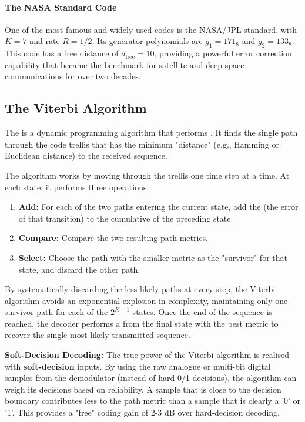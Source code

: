 \paragraph{The NASA Standard Code}
One of the most famous and widely used codes is the NASA/JPL standard, with $K=7$ and rate $R=1/2$. Its generator polynomials are $g_1 = 171_8$ and $g_2 = 133_8$. This code has a free distance of $d_{\text{free}}=10$, providing a powerful error correction capability that became the benchmark for satellite and deep-space communications for over two decades.


\subsection{The Viterbi Algorithm}

The  is a dynamic programming algorithm that performs . It finds the single path through the code trellis that has the minimum "distance" (e.g., Hamming or Euclidean distance) to the received sequence.

The algorithm works by moving through the trellis one time step at a time. At each state, it performs three operations:
\begin{enumerate}
    \item \textbf{Add:} For each of the two paths entering the current state, add the  (the error of that transition) to the cumulative  of the preceding state.
    \item \textbf{Compare:} Compare the two resulting path metrics.
    \item \textbf{Select:} Choose the path with the smaller metric as the "survivor" for that state, and discard the other path.
\end{enumerate}
By systematically discarding the less likely paths at every step, the Viterbi algorithm avoids an exponential explosion in complexity, maintaining only one survivor path for each of the $2^{K-1}$ states. Once the end of the sequence is reached, the decoder performs a  from the final state with the best metric to recover the single most likely transmitted sequence.

\begin{warningbox}
    \textbf{Soft-Decision Decoding:} The true power of the Viterbi algorithm is realised with \textbf{soft-decision} inputs. By using the raw analogue or multi-bit digital samples from the demodulator (instead of hard 0/1 decisions), the algorithm can weigh its decisions based on reliability. A sample that is close to the decision boundary contributes less to the path metric than a sample that is clearly a '0' or '1'. This provides a "free" coding gain of 2-3 dB over hard-decision decoding.
\end{warningbox}


